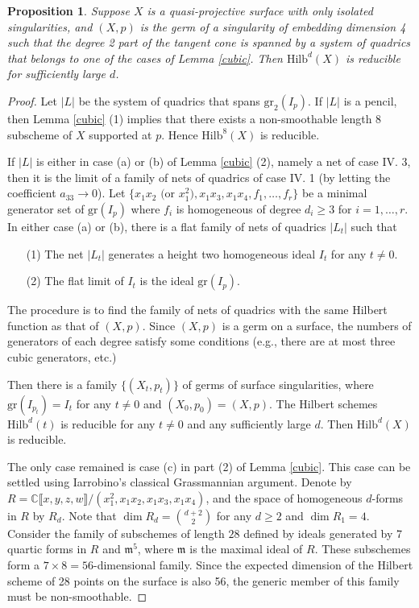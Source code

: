 \documentclass{amsart}[12pt]
\newtheorem{prop}[theorem]{Proposition}
\theoremstyle{definition}
\theoremstyle{remark}
\numberwithin{equation}{section}
\newcommand{\abs}[1]{\lvert#1\rvert}
\begin{document}
\begin{prop}
Suppose $X$ is a quasi-projective surface with only isolated singularities, and $(X, p)$ is the germ of a singularity of embedding dimension 4 such that the degree 2 part of the tangent cone is spanned by a system of quadrics that belongs to one of the cases of Lemma \ref{cubic}. Then $\mathrm{Hilb}^d(X)$ is reducible for sufficiently large $d$.
\end{prop}
\begin{proof}
Let $\abs{L}$ be the system of quadrics that spans $\mathrm{gr}_2(I_p)$. If $\abs{L}$ is a pencil, then Lemma \ref{cubic} (1) implies that there exists a non-smoothable length 8 subscheme of $X$ supported at $p$. Hence $\mathrm{Hilb}^8(X)$ is reducible. 

If $\abs{L}$ is either in case (a) or (b) of Lemma \ref{cubic} (2), namely a net of case IV. 3, then it is the limit of a family of nets of quadrics of case IV. 1 (by letting the coefficient $a_{33} \to 0$). Let $\{x_1x_2 \textrm{ (or } x_1^2), x_1x_3, x_1x_4, f_1, \dots, f_r \}$ be a minimal generator set of $\mathrm{gr}(I_p)$ where $f_i$ is homogeneous of degree $d_i \geq 3$ for $i = 1, \dots, r$. In either case (a) or (b), there is a flat family of nets of quadrics $\abs{L_t}$ such that
\begin{itemize}
\item[(1)] The net $\abs{L_t}$ generates a height two homogeneous ideal $I_t$ for any $t \neq 0$.
\item[(2)] The flat limit of $I_t$ is the ideal $\mathrm{gr}(I_p)$. 
\end{itemize}
The procedure is to find the family of nets of quadrics with the same Hilbert function as that of $(X, p)$. Since $(X, p)$ is a germ on a surface, the numbers of generators of each degree satisfy some conditions (e.g., there are at most three cubic generators, etc.)

Then there is a family $\{(X_t, p_t)\}$ of germs of surface singularities, where $\mathrm{gr}(I_{p_t}) = I_t$ for any $t \neq 0$ and $(X_0, p_0) = (X, p)$. The Hilbert schemes $\mathrm{Hilb}^d(t)$ is reducible for any $t \neq 0$ and any sufficiently large $d$. Then $\mathrm{Hilb}^d(X)$ is reducible. 


The only case remained is case (c) in part (2) of Lemma \ref{cubic}. This case can be settled using Iarrobino's classical Grassmannian argument. Denote by $R = \mathbb{C}\llbracket x, y, z, w \rrbracket /(x_1^2, x_1x_2, x_1x_3, x_1x_4)$, and the space of homogeneous $d$-forms in $R$ by $R_d$. Note that $\dim R_d = {d + 2 \choose 2}$ for any $d \geq 2$ and $\dim R_1 = 4$. Consider the family of subschemes of length $28$ defined by ideals generated by 7 quartic forms in $R$ and $\mathfrak{m}^5$, where $\mathfrak{m}$ is the maximal ideal of $R$. These subschemes form a $7 \times 8 = 56$-dimensional family. Since the expected dimension of the Hilbert scheme of 28 points on the surface is also 56, the generic member of this family must be non-smoothable. 


\end{proof}
\end{document}

